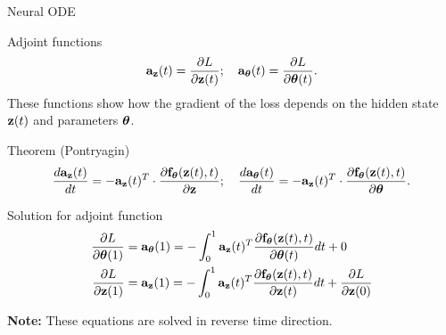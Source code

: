 \begin{frame}{Neural ODE}
	\vspace{-0.2cm}
	\begin{block}{Adjoint functions}
		\vspace{-0.4cm}
		\[
			\mathbf{a}_{\mathbf{z}}(t) = \frac{\partial L}{\partial \mathbf{z}(t)}; \quad \mathbf{a}_{\boldsymbol{\theta}}(t) = \frac{\partial L}{\partial \boldsymbol{\theta}(t)}.
		\]
		These functions show how the gradient of the loss depends on the hidden state~$\mathbf{z}(t)$ and parameters $\boldsymbol{\theta}$.
		\vspace{-0.3cm}
	\end{block}

	\begin{block}{Theorem (Pontryagin)}
		\vspace{-0.6cm}
		\[
		\frac{d \mathbf{a}_{\mathbf{z}}(t)}{dt} = - \mathbf{a}_{\mathbf{z}}(t)^T \cdot \frac{\partial \mathbf{f}_{\boldsymbol{\theta}}(\mathbf{z}(t), t)}{\partial \mathbf{z}}; \quad \frac{d \mathbf{a}_{\boldsymbol{\theta}}(t)}{dt} = - \mathbf{a}_{\mathbf{z}}(t)^T \cdot \frac{\partial \mathbf{f}_{\boldsymbol{\theta}}(\mathbf{z}(t),  t)}{\partial \boldsymbol{\theta}}.
		\]
		\vspace{-0.7cm}
	\end{block}
	\begin{block}{Solution for adjoint function}
		\vspace{-0.6cm}
		{\small
		\begin{align*}
			\frac{\partial L}{\partial \boldsymbol{\theta}(1)} &= \mathbf{a}_{\boldsymbol{\theta}}(1) =  - \int_{0}^{1} \mathbf{a}_{\mathbf{z}}(t)^T \frac{\partial \mathbf{f}_{\boldsymbol{\theta}}(\mathbf{z}(t), t)}{\partial \boldsymbol{\theta}(t)} dt + 0\\
			\frac{\partial L}{\partial \mathbf{z}(1)} &= \mathbf{a}_{\mathbf{z}}(1) =  - \int_{0}^{1} \mathbf{a}_{\mathbf{z}}(t)^T \frac{\partial \mathbf{f}_{\boldsymbol{\theta}}(\mathbf{z}(t), t)}{\partial \mathbf{z}(t)} dt + \frac{\partial L}{\partial \mathbf{z}(0)}\\
		\end{align*}
		}
		\vspace{-1.3cm}
	\end{block}
	\textbf{Note:} These equations are solved in reverse time direction.
\end{frame}
